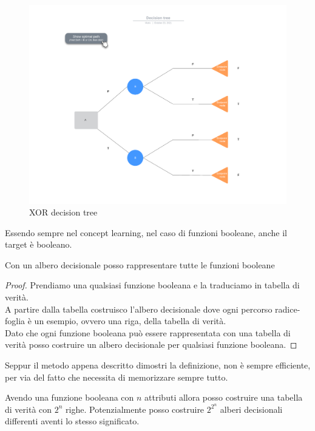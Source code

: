 \begin{esempio}
  \begin{figure}[h]
    \centering
    \includegraphics[scale = 0.5]{img/XOR.pdf}
    \caption{XOR decision tree}
    \label{XOR decision tree}
  \end{figure}
\end{esempio}
Essendo sempre nel concept learning, nel caso di funzioni booleane, anche il
target è booleano.
\begin{definizione}
  Con un albero decisionale posso rappresentare tutte le
  funzioni booleane
\end{definizione}
\begin{proof}
  Prendiamo una qualsiasi funzione booleana e la traduciamo in tabella di
  verità.\\
  A partire dalla tabella costruisco l'albero decisionale dove ogni percorso
  radice-foglia è un esempio, ovvero una riga, della tabella di verità.\\
  Dato che ogni funzione booleana può essere rappresentata con una tabella di
  verità posso costruire un albero decisionale per qualsiasi funzione booleana.
\end{proof}
Seppur il metodo appena descritto dimostri la definizione, non è sempre
efficiente, per via del fatto che necessita di memorizzare sempre tutto.
\begin{definizione}
  Avendo una funzione booleana con $n$ attributi allora posso costruire una
  tabella di verità con $2^n$ righe. Potenzialmente posso costruire 
  $2^{2^n}$ alberi decisionali differenti aventi lo stesso significato.
\end{definizione}
